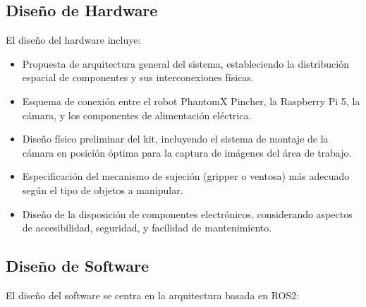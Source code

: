 \subsection{Diseño de Hardware}

El diseño del hardware incluye:

\begin{itemize}
    \item Propuesta de arquitectura general del sistema, estableciendo la distribución espacial de componentes y sus interconexiones físicas.
    
    \item Esquema de conexión entre el robot PhantomX Pincher, la Raspberry Pi 5, la cámara, y los componentes de alimentación eléctrica.
    
    \item Diseño físico preliminar del kit, incluyendo el sistema de montaje de la cámara en posición óptima para la captura de imágenes del área de trabajo.
    
    \item Especificación del mecanismo de sujeción (gripper o ventosa) más adecuado según el tipo de objetos a manipular.
    
    \item Diseño de la disposición de componentes electrónicos, considerando aspectos de accesibilidad, seguridad, y facilidad de mantenimiento.
\end{itemize}

\subsection{Diseño de Software}

El diseño del software se centra en la arquitectura basada en ROS2:

